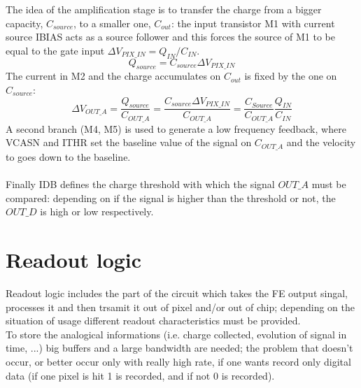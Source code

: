       The idea of the amplification stage is to transfer the charge from a bigger capacity\cite{ALPIDE-FE}, $C_{source}$, to a smaller one, $C_{out}$: the input transistor M1 with current source IBIAS acts as a source follower and this forces the source of M1 to be equal to the gate input  $\Delta V_{PIX\_IN} = Q_{IN}/C_{IN}$.
      \begin{equation}
         Q_{source} = C_{source} \Delta V_{PIX\_IN}
      \end{equation}
      The current in M2 and the charge accumulates on $C_{out}$ is fixed by the one on $C_{source}$:
      \begin{equation}
         \Delta V_{OUT\_A} = \frac{Q_{source}}{C_{OUT\_A}} = \frac{C_{source}\Delta V_{PIX\_IN}}{C_{OUT\_A}}  = \frac{C_{Source}}{C_{OUT\_A}}\frac{Q_{IN}}{C_{IN}}
      \end{equation}
      A second branch (M4, M5) is used to generate a low frequency feedback, where VCASN and ITHR set the baseline value of the signal on $C_{OUT\_A}$ and the velocity to goes down to the baseline.\\
      \\
      Finally IDB defines the charge threshold with which the signal $OUT\_A$ must be compared: depending on if the signal is higher than the threshold or not, the $OUT\_D$ is high or low respectively.
      
\section{Readout logic}
   Readout logic includes the part of the circuit which takes the FE output singal, processes it and then trsamit it out of pixel and/or out of chip; depending on the situation of usage different readout characteristics must be provided. \\
   To store the analogical informations (i.e. charge collected, evolution of signal in time, ...) big buffers and a large bandwidth are needed; the problem that doesn't occur, or better occur only with really high rate, if one wants record only digital data (if one pixel is hit 1 is recorded, and if not 0 is recorded). 

